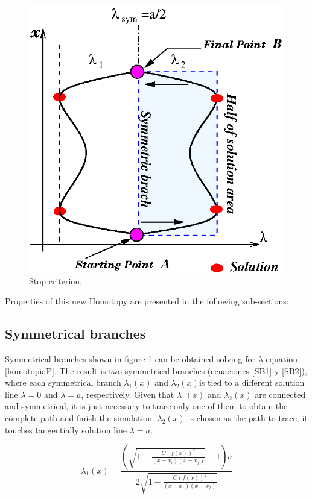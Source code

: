 \documentclass[conference,letterpaper,onecolumn]{IEEEtran}
\begin{document}
\begin{figure}[hbtp]
\centering
\includegraphics[scale=0.75]{fig/dbh2.eps}
\caption{Stop criterion.}
\label{halftrack}
\end{figure}

Properties of this new Homotopy are presented in the following sub-sections:

\subsection{Symmetrical branches}

Symmetrical branches shown in figure \ref{halftrack} can be obtained solving for $\lambda$ equation \ref{homotopiaP}. The result is two symmetrical branches (ecuaciones \ref{SB1} y \ref{SB2}), where each symmetrical branch $\lambda_1(x)$ and $\lambda_2(x)$is tied to a different solution line $\lambda=0$ and $\lambda=a$, respectively. Given that $\lambda_1(x)$ and $\lambda_2(x)$ are connected and symmetrical, it is just necessary to trace only one of them to obtain the complete path and finish the simulation. $\lambda_2(x)$ is chosen as the path to trace, it touches tangentially solution line $\lambda=a$.

\begin{equation}
\lambda_1(x)= {\frac {\left( \sqrt {1-{\frac {C \left( f \left( x \right)  \right) ^{2
}}{ \left( x-x_i \right)  \left( x-x_f \right) }}}-1
 \right) a}{2\sqrt {1-{\frac {C \left( f \left( x \right) 
 \right) ^{2}}{ \left( x-x_i \right)  \left( x-x_f
 \right) }}}}}
\label{SB1}
\end{equation}
\end{document}
